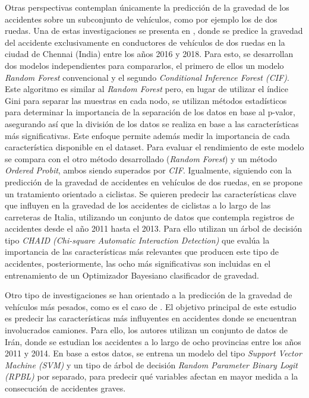 Otras perspectivas contemplan únicamente la predicción de la gravedad de los accidentes sobre un subconjunto de vehículos, como por ejemplo los de dos ruedas. Una de estas investigaciones se presenta en \cite{panicker2022injury}, donde se predice la gravedad del accidente exclusivamente en conductores de vehículos de dos ruedas en la ciudad de Chennai (India) entre los años 2016 y 2018. Para esto, se desarrollan dos modelos independientes para compararlos, el primero de ellos un modelo \textit{Random Forest} convencional y  el segundo \textit{Conditional Inference Forest (CIF)}. Este algoritmo es similar al \textit{Random Forest} pero, en lugar de utilizar el índice Gini para separar las muestras en cada nodo, se utilizan métodos estadísticos para determinar la importancia de la separación de los datos en base al p-valor, asegurando así que la división de los datos se realiza en base a las características más significativas. Este enfoque permite además medir la importancia de cada característica disponible en el dataset. Para evaluar el rendimiento de este modelo se compara con el otro método desarrollado (\textit{Random Forest}) y un método \textit{Ordered Probit}, ambos siendo superados por \textit{CIF}. Igualmente, siguiendo con la predicción de la gravedad de accidentes en vehículos de dos ruedas, en \cite{prati2017using} se propone un tratamiento orientado a ciclistas. Se quieren predecir las características clave que influyen en la gravedad de los accidentes de ciclistas a lo largo de las carreteras de Italia, utilizando un conjunto de datos que contempla registros de accidentes desde el año 2011 hasta el 2013. Para ello utilizan un árbol de decisión tipo \textit{CHAID (Chi-square Automatic Interaction Detection)} que evalúa la importancia de las características más relevantes que producen este tipo de accidentes, posteriormente, las ocho más significativas son incluidas en el entrenamiento de un Optimizador Bayesiano clasificador de gravedad.

Otro tipo de investigaciones se han orientado a la predicción de la gravedad de vehículos más pesados, como es el caso de \cite{hosseinzadeh2021investigating}. El objetivo principal de este estudio es predecir las características más influyentes en accidentes donde se encuentran involucrados camiones. Para ello, los autores utilizan un conjunto de datos de Irán, donde se estudian los accidentes a lo largo de ocho provincias entre los años 2011 y 2014. En base a estos datos, se entrena un modelo del tipo \textit{Support Vector Machine (SVM)} y un tipo de árbol de decisión \textit{Random Parameter Binary Logit (RPBL)} por separado, para predecir qué variables afectan en mayor medida a la consecución de accidentes graves. 

